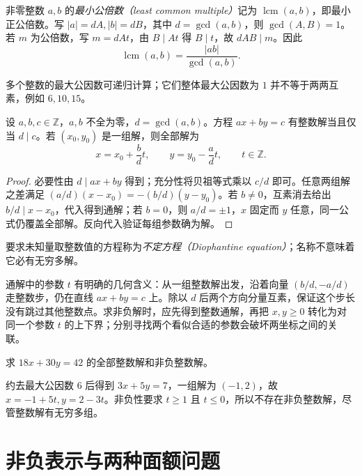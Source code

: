 非零整数 $a,b$ 的\emph{最小公倍数（least common multiple）}记为 $\operatorname{lcm}(a,b)$，即最小正公倍数。写 $|a|=dA,|b|=dB$，其中 $d=\gcd(a,b)$，则 $\gcd(A,B)=1$。若 $m$ 为公倍数，写 $m=dAt$，由 $B\mid At$ 得 $B\mid t$，故 $dAB\mid m$。因此
\begin{equation}
 \operatorname{lcm}(a,b)=\frac{|ab|}{\gcd(a,b)}.
 \label{eq:gcd-lcm}
\end{equation}

多个整数的最大公因数可递归计算；它们整体最大公因数为 $1$ 并不等于两两互素，例如 $6,10,15$。

\begin{theorem}[一次不定方程]
\label{thm:linear-diophantine}
设 $a,b,c\in\mathbb Z$，$a,b$ 不全为零，$d=\gcd(a,b)$。方程 $ax+by=c$ 有整数解当且仅当 $d\mid c$。若 $(x_0,y_0)$ 是一组解，则全部解为
\begin{equation}
 x=x_0+\frac bd t,\qquad y=y_0-\frac ad t,\qquad t\in\mathbb Z.
 \label{eq:linear-diophantine-solutions}
\end{equation}
\end{theorem}
\begin{proof}
必要性由 $d\mid ax+by$ 得到；充分性将贝祖等式乘以 $c/d$ 即可。任意两组解之差满足 $(a/d)(x-x_0)=-(b/d)(y-y_0)$。若 $b\ne0$，互素消去给出 $b/d\mid x-x_0$，代入得到通解；若 $b=0$，则 $a/d=\pm1$，$x$ 固定而 $y$ 任意，同一公式仍覆盖全部解。反向代入验证每组参数确为解。
\end{proof}

要求未知量取整数值的方程称为\emph{不定方程（Diophantine equation）}；名称不意味着它必有无穷多解。

通解中的参数 $t$ 有明确的几何含义：从一组整数解出发，沿着向量 $(b/d,-a/d)$ 走整数步，仍在直线 $ax+by=c$ 上。除以 $d$ 后两个方向分量互素，保证这个步长没有跳过其他整数点。求非负解时，应先得到整数通解，再把 $x,y\ge0$ 转化为对同一个参数 $t$ 的上下界；分别寻找两个看似合适的参数会破坏两坐标之间的关联。

\begin{example}
求 $18x+30y=42$ 的全部整数解和非负整数解。
\end{example}
\begin{solve}
约去最大公因数 $6$ 后得到 $3x+5y=7$，一组解为 $(-1,2)$，故 $x=-1+5t,y=2-3t$。非负性要求 $t\ge1$ 且 $t\le0$，所以不存在非负整数解，尽管整数解有无穷多组。
\end{solve}

\section{非负表示与两种面额问题}


